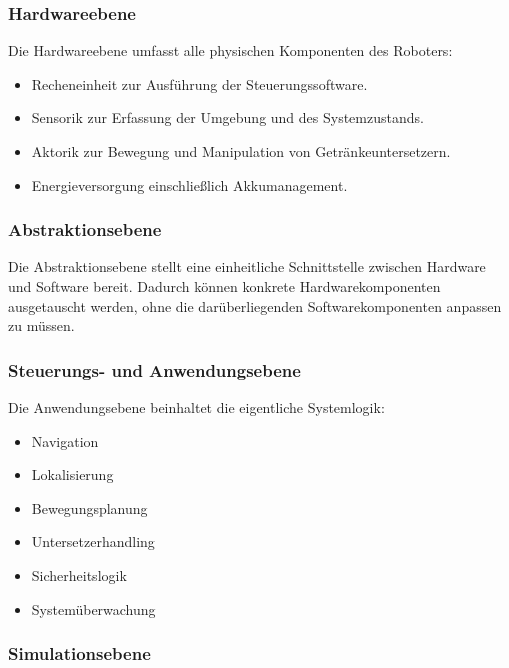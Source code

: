 \documentclass[
  a4paper,
  12pt,
  DIV=12,        %
  parskip=half,  %
  headings=small %
]{scrartcl}
\theoremstyle{definition}
\providecommand{\tightlist}{%
  \setlength{\itemsep}{0pt}\setlength{\parskip}{0pt}}
\theoremstyle{definition}
\providecommand{\tightlist}{%
  \setlength{\itemsep}{0pt}\setlength{\parskip}{0pt}}
\begin{document}
\subsubsection{Hardwareebene}\label{hardwareebene}

Die Hardwareebene umfasst alle physischen Komponenten des Roboters:

\begin{itemize}
\tightlist
\item
  Recheneinheit zur Ausführung der Steuerungssoftware.
\item
  Sensorik zur Erfassung der Umgebung und des Systemzustands.
\item
  Aktorik zur Bewegung und Manipulation von Getränkeuntersetzern.
\item
  Energieversorgung einschließlich Akkumanagement.
\end{itemize}

\subsubsection{Abstraktionsebene}\label{abstraktionsebene}

Die Abstraktionsebene stellt eine einheitliche Schnittstelle zwischen
Hardware und Software bereit. Dadurch können konkrete
Hardwarekomponenten ausgetauscht werden, ohne die darüberliegenden
Softwarekomponenten anpassen zu müssen.

\subsubsection{Steuerungs- und
Anwendungsebene}\label{steuerungs--und-anwendungsebene}

Die Anwendungsebene beinhaltet die eigentliche Systemlogik:

\begin{itemize}
\tightlist
\item
  Navigation
\item
  Lokalisierung
\item
  Bewegungsplanung
\item
  Untersetzerhandling
\item
  Sicherheitslogik
\item
  Systemüberwachung
\end{itemize}

\subsubsection{Simulationsebene}\label{simulationsebene}
\end{document}
